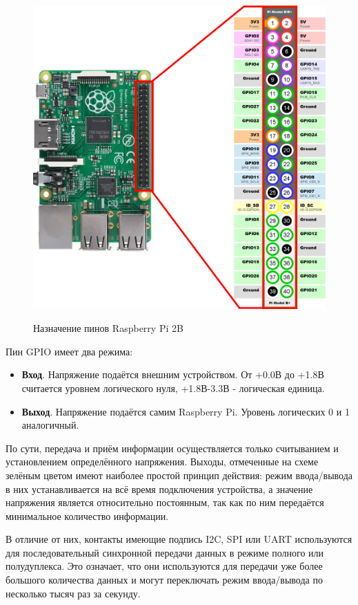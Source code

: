 \begin{figure}[h!] 
	\begin{center}
		{\includegraphics[scale=0.15, angle=0]{img/gpio.pdf}}
		\caption{Назначение пинов Raspberry Pi 2B}
		\label{pic:gpio}
	\end{center}
\end{figure}

Пин GPIO имеет два режима:
\begin{itemize}
	\item \textbf{Вход}. Напряжение подаётся внешним устройством. От +0.0В до +1.8В считается уровнем логического нуля, +1.8В-3.3В - логическая единица.
	\item \textbf{Выход}. Напряжение подаётся самим Raspberry Pi. Уровень логических 0 и 1 аналогичный.
\end{itemize}

По сути, передача и приём информации осуществляется только считыванием и установлением определённого напряжения. Выходы, отмеченные на схеме зелёным цветом имеют наиболее простой принцип действия: режим ввода/вывода в них устанавливается на всё время подключения устройства, а значение напряжения является относительно постоянным, так как по ним передаётся минимальное количество информации. 

В отличие от них, контакты имеющие подпись I2C, SPI или UART используются для последовательный синхронной передачи данных в режиме полного или полудуплекса. Это означает, что они используются для передачи уже более большого количества данных и могут переключать режим ввода/вывода по несколько тысяч раз за секунду. 


